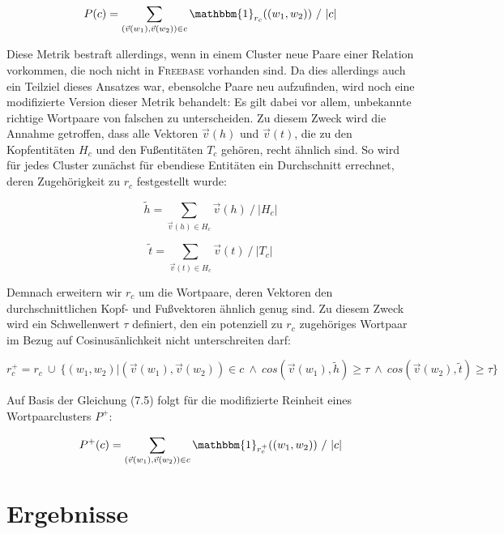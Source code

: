 \begin{equation}
    P(c) = \sum_{(\vec{v}(w_1), \vec{v}(w_2)) \in c} \mathbbm{1}_{r_c}((w_1, w_2))\ /\ |c|
\end{equation}

Diese Metrik bestraft allerdings, wenn in einem Cluster neue Paare einer Relation vorkommen, die noch nicht in \textsc{Freebase}
vorhanden sind. Da dies allerdings auch ein Teilziel dieses Ansatzes war, ebensolche Paare neu aufzufinden, wird noch
eine modifizierte Version dieser Metrik behandelt: Es gilt dabei vor allem, unbekannte richtige Wortpaare von falschen
zu unterscheiden. Zu diesem Zweck wird die Annahme getroffen, dass alle Vektoren $\vec{v}(h)$ und $\vec{v}(t)$, die zu den Kopfentitäten $H_c$ und
den Fußentitäten $T_c$ gehören, recht ähnlich sind. So wird für jedes Cluster zunächst für ebendiese Entitäten ein Durchschnitt
errechnet, deren Zugehörigkeit zu $r_c$ festgestellt wurde:

\begin{equation}
  \tilde{h} = \sum_{\vec{v}(h) \in H_c} \vec{v}(h)\ /\ |H_c|
\end{equation}

\begin{equation}
  \tilde{t} = \sum_{\vec{v}(t) \in H_c} \vec{v}(t)\ /\ |T_c|
\end{equation}

Demnach erweitern wir $r_c$ um die Wortpaare, deren Vektoren den durchschnittlichen Kopf- und Fußvektoren ähnlich genug sind.
Zu diesem Zweck wird ein Schwellenwert $\tau$ definiert, den ein potenziell zu $r_c$ zugehöriges Wortpaar im Bezug auf
Cosinusänlichkeit nicht unterschreiten darf:

\begin{equation}
  r_c^+ = r_c\ \cup\ \{(w_1, w_2)| (\vec{v}(w_1), \vec{v}(w_2)) \in c\ \land\ cos(\vec{v}(w_1), \tilde{h}) \geq \tau\ \land\ cos(\vec{v}(w_2), \tilde{t}) \geq \tau\}
\end{equation}

Auf Basis der Gleichung (7.5) folgt für die modifizierte Reinheit eines Wortpaarclusters $P^+$:

\begin{equation}
  P^+(c) = \sum_{(\vec{v}(w_1), \vec{v}(w_2)) \in c} \mathbbm{1}_{r_c^+}((w_1, w_2))\ /\ |c|
\end{equation}

\section{Ergebnisse}

